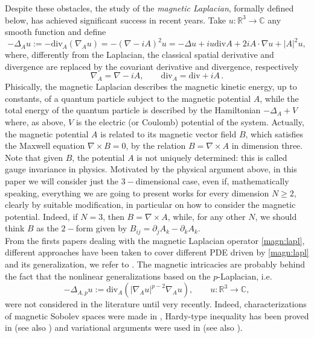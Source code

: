 \documentclass[leqno,11pt]{amsart}
\newcommand{\R}{\mathbb R}
\newcommand{\C}{\mathbb C}
\numberwithin{equation}{section}
\newcommand{\divv}{\text{div}}
\begin{document}
Despite these obstacles, the study of the \textit{magnetic Laplacian}, formally defined below, has achieved significant success in recent years. Take $u:\R^3 \to \C$ any smooth function and define
\begin{equation}\label{magn:lapl}
    -\Delta_A u :=-\divv_A(\nabla_A u)= -(\nabla -i A)^2u=-\Delta u + iu\divv A + 2iA\cdot \nabla u + |A|^2 u,
\end{equation}
where, differently from the Laplacian, the classical spatial derivative and divergence are replaced by the covariant derivative and divergence, respectively
\begin{equation}
    \nabla_A = \nabla - iA, \qquad \divv_A=\divv+iA\,.
\end{equation} 
Phisically, the magnetic Laplacian describes the magnetic kinetic energy, up to constants, of a quantum particle subject to the magnetic potential $A$, while the total energy of the quantum particle is described by the Hamiltonian $-\Delta_A+V$ where, as above, $V$ is the electric (or Coulomb) potential of the system. Actually, the magnetic potential $A$ is related to its magnetic vector field $B$, which satisfies the Maxwell equation $\nabla \times B=0$, by the relation $B = \nabla \times A$ in dimension three. Note that
given $B$, the potential $A$ is not uniquely determined: this is called gauge invariance in physics. Motivated by the physical argument above, in this paper we will consider just the $3-$dimensional case, even if, mathematically speaking, everything we are going to present works for every dimension $N \geq 2$, clearly by suitable modification, in particular on how to consider the magnetic potential. Indeed, if $N=3$, then $B=\nabla \times A$, while, for any other $N$, we should think $B$ as the $2-$form given by $B_{ij}=\partial_jA_k - \partial_kA_k$.\\
From the firsts papers \cite{ReedSimon1975, EstebanLions, AvronHerbstSimon} dealing with the magnetic Laplacian operator \eqref{magn:lapl}, different approaches have been taken to cover different PDE driven by \eqref{magn:lapl} and its generalization, we refer to \cite{pankov, ArioliSzulkin2003, chabszulkin, kurata, cingolani, Ambrosio_schrodinger, BoNyVS2019, CiClSe2012}.
The magnetic intricacies are probably behind the fact that the nonlinear generalizations based on the $p$-Laplacian, i.e.
\begin{equation}
-\Delta_{A,p}u:=\divv_A(|\nabla_Au|^{p-2}\nabla_Au), \qquad u:\R^3 \to \C,
\end{equation}
were not considered in the literature until very recently. Indeed, characterizations of magnetic Sobolev spaces were made in \cite{NguyenPinamontiSquassinaVecchi_2018}, Hardy-type inequality has been proved in \cite{ckl} (see also \cite{ChenTang}) and variational arguments were used in \cite{bfk} (see also \cite{WeiSong}).
\end{document}
